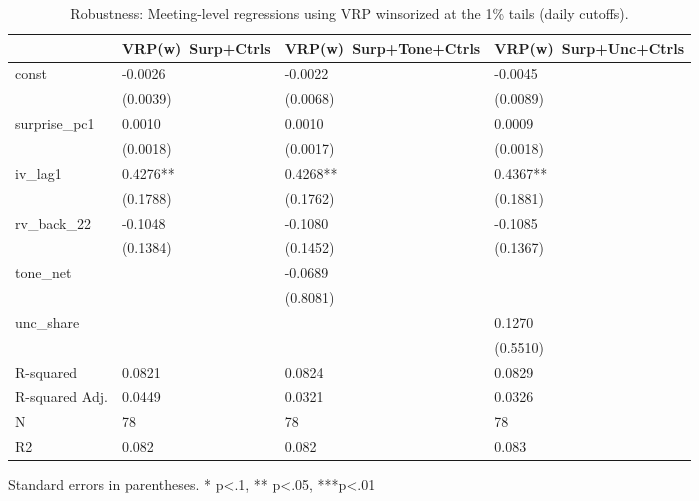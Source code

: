 \begin{table}
\caption{Robustness: Meeting-level regressions using VRP winsorized at the 1\% tails (daily cutoffs).}
\label{tab:meet_vrp_winsor}
\begin{center}
\begin{tabular}{llll}
\hline
               & VRP(w)~Surp+Ctrls & VRP(w)~Surp+Tone+Ctrls & VRP(w)~Surp+Unc+Ctrls  \\
\hline
const          & -0.0026           & -0.0022                & -0.0045                \\
               & (0.0039)          & (0.0068)               & (0.0089)               \\
surprise\_pc1  & 0.0010            & 0.0010                 & 0.0009                 \\
               & (0.0018)          & (0.0017)               & (0.0018)               \\
iv\_lag1       & 0.4276**          & 0.4268**               & 0.4367**               \\
               & (0.1788)          & (0.1762)               & (0.1881)               \\
rv\_back\_22   & -0.1048           & -0.1080                & -0.1085                \\
               & (0.1384)          & (0.1452)               & (0.1367)               \\
tone\_net      &                   & -0.0689                &                        \\
               &                   & (0.8081)               &                        \\
unc\_share     &                   &                        & 0.1270                 \\
               &                   &                        & (0.5510)               \\
R-squared      & 0.0821            & 0.0824                 & 0.0829                 \\
R-squared Adj. & 0.0449            & 0.0321                 & 0.0326                 \\
N              & 78                & 78                     & 78                     \\
R2             & 0.082             & 0.082                  & 0.083                  \\
\hline
\end{tabular}
\end{center}
\end{table}
\bigskip
Standard errors in parentheses. \newline 
* p<.1, ** p<.05, ***p<.01